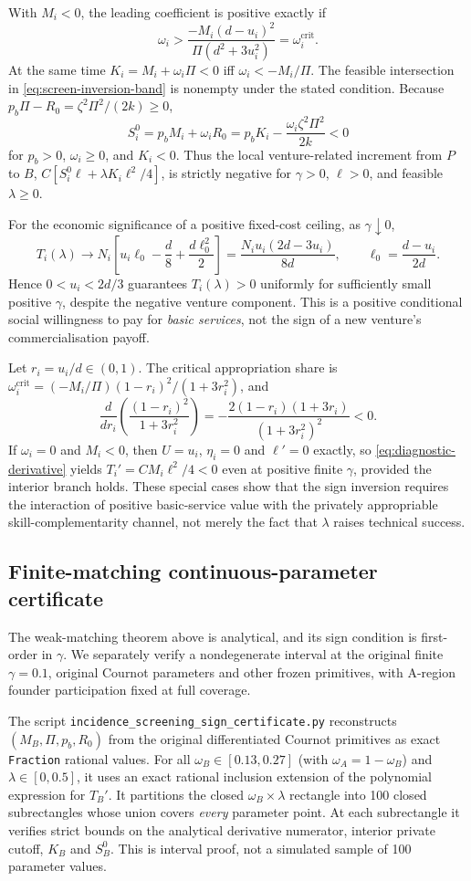 With $M_i<0$, the leading coefficient is positive exactly if
\[
 \omega_i>\frac{-M_i(d-u_i)^2}{\Pi(d^2+3u_i^2)}
       =\omega_i^{\mathrm{crit}}.
\]
At the same time $K_i=M_i+\omega_i\Pi<0$ iff $\omega_i<-M_i/\Pi$. The feasible intersection in \eqref{eq:screen-inversion-band} is nonempty under the stated condition. Because $p_b\Pi-R_0=\zeta^2\Pi^2/(2k)\geq0$,
\[
 S_i^0=p_bM_i+\omega_iR_0
     =p_bK_i-\frac{\omega_i\zeta^2\Pi^2}{2k}<0
\]
for $p_b>0$, $\omega_i\geq0$, and $K_i<0$.
Thus the local venture-related increment from $P$ to $B$,
$C[S_i^0\ell+\lambda K_i\ell^2/4]$, is strictly negative for $\gamma>0$, $\ell>0$, and feasible $\lambda\geq0$.

For the economic significance of a positive fixed-cost ceiling, as $\gamma\downarrow0$,
\[
 T_i(\lambda)\longrightarrow
 N_i\left[u_i\ell_0-\frac d8+\frac{d\ell_0^2}{2}\right]
 =\frac{N_iu_i(2d-3u_i)}{8d},\qquad
 \ell_0=\frac{d-u_i}{2d}.
\]
Hence $0<u_i<2d/3$ guarantees $T_i(\lambda)>0$ uniformly for sufficiently small positive $\gamma$, despite the negative venture component. This is a positive conditional social willingness to pay for \emph{basic services}, not the sign of a new venture's commercialisation payoff.

Let $r_i=u_i/d\in(0,1)$. The critical appropriation share is
$\omega_i^{\mathrm{crit}}=(-M_i/\Pi)(1-r_i)^2/(1+3r_i^2)$, and
\[
 \frac{d}{dr_i}\left(\frac{(1-r_i)^2}{1+3r_i^2}\right)
   =-\frac{2(1-r_i)(1+3r_i)}{(1+3r_i^2)^2}<0.
\]
If $\omega_i=0$ and $M_i<0$, then $U=u_i$, $\eta_i=0$ and $\ell'=0$ exactly, so \eqref{eq:diagnostic-derivative} yields
$T_i'=CM_i\ell^2/4<0$ even at positive finite $\gamma$, provided the interior branch holds. These special cases show that the sign inversion requires the interaction of positive basic-service value with the privately appropriable skill-complementarity channel, not merely the fact that $\lambda$ raises technical success.

\subsection{Finite-matching continuous-parameter certificate}
The weak-matching theorem above is analytical, and its sign condition is first-order in $\gamma$. We separately verify a nondegenerate interval at the original finite $\gamma=0.1$, original Cournot parameters and other frozen primitives, with A-region founder participation fixed at full coverage.

The script \texttt{incidence\_screening\_sign\_certificate.py} reconstructs $(M_B,\Pi,p_b,R_0)$ from the original differentiated Cournot primitives as exact \texttt{Fraction} rational values. For all $\omega_B\in[0.13,0.27]$ (with $\omega_A=1-\omega_B$) and $\lambda\in[0,0.5]$, it uses an exact rational inclusion extension of the polynomial expression for $T_B'$. It partitions the closed $\omega_B\times\lambda$ rectangle into 100 closed subrectangles whose union covers \emph{every} parameter point. At each subrectangle it verifies strict bounds on the analytical derivative numerator, interior private cutoff, $K_B$ and $S_B^0$. This is interval proof, not a simulated sample of 100 parameter values.

